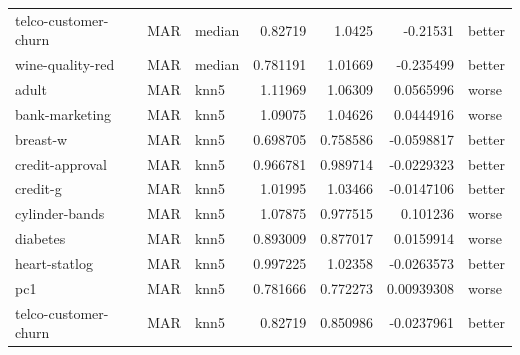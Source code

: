 \begin{table}[ht]
\begin{tabular}{lllrrrl}
 telco-customer-churn & MAR         & median           &                                 0.82719  &                             1.0425   &                    -0.21531    & better               \\
 wine-quality-red     & MAR         & median           &                                 0.781191 &                             1.01669  &                    -0.235499   & better               \\
 adult                & MAR         & knn5             &                                 1.11969  &                             1.06309  &                     0.0565996  & worse                \\
 bank-marketing       & MAR         & knn5             &                                 1.09075  &                             1.04626  &                     0.0444916  & worse                \\
 breast-w             & MAR         & knn5             &                                 0.698705 &                             0.758586 &                    -0.0598817  & better               \\
 credit-approval      & MAR         & knn5             &                                 0.966781 &                             0.989714 &                    -0.0229323  & better               \\
 credit-g             & MAR         & knn5             &                                 1.01995  &                             1.03466  &                    -0.0147106  & better               \\
 cylinder-bands       & MAR         & knn5             &                                 1.07875  &                             0.977515 &                     0.101236   & worse                \\
 diabetes             & MAR         & knn5             &                                 0.893009 &                             0.877017 &                     0.0159914  & worse                \\
 heart-statlog        & MAR         & knn5             &                                 0.997225 &                             1.02358  &                    -0.0263573  & better               \\
 pc1                  & MAR         & knn5             &                                 0.781666 &                             0.772273 &                     0.00939308 & worse                \\
 telco-customer-churn & MAR         & knn5             &                                 0.82719  &                             0.850986 &                    -0.0237961  & better               \\

\end{tabular}
\end{table}
